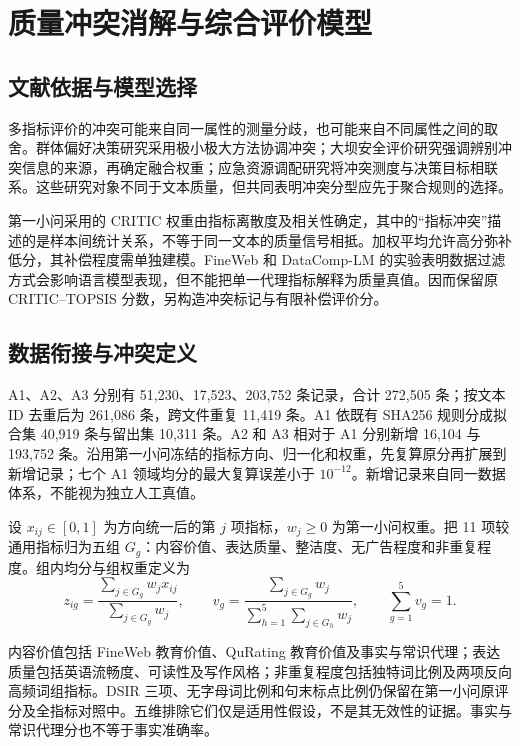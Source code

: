 \documentclass[UTF8,a4paper,12pt]{ctexart}
\begin{document}
\setcounter{section}{2}
\section{质量冲突消解与综合评价模型}
\label{sec:q12}

\subsection{文献依据与模型选择}

多指标评价的冲突可能来自同一属性的测量分歧，也可能来自不同属性之间的取舍。群体偏好决策研究采用极小极大方法协调冲突\cite{yu2016}；大坝安全评价研究强调辨别冲突信息的来源，再确定融合权重\cite{wang2023}；应急资源调配研究将冲突测度与决策目标相联系\cite{chen2026}。这些研究对象不同于文本质量，但共同表明冲突分型应先于聚合规则的选择。

第一小问采用的 CRITIC 权重由指标离散度及相关性确定\cite{diakoulaki1995}，其中的“指标冲突”描述的是样本间统计关系，不等于同一文本的质量信号相抵。加权平均允许高分弥补低分，其补偿程度需单独建模\cite{giarlotta2001}。FineWeb 和 DataComp-LM 的实验表明数据过滤方式会影响语言模型表现\cite{penedo2024,li2024}，但不能把单一代理指标解释为质量真值。因而保留原 CRITIC--TOPSIS 分数，另构造冲突标记与有限补偿评价分。

\subsection{数据衔接与冲突定义}

A1、A2、A3 分别有 51,230、17,523、203,752 条记录，合计 272,505 条；按文本 ID 去重后为 261,086 条，跨文件重复 11,419 条。A1 依既有 SHA256 规则分成拟合集 40,919 条与留出集 10,311 条。A2 和 A3 相对于 A1 分别新增 16,104 与 193,752 条。沿用第一小问冻结的指标方向、归一化和权重，先复算原分再扩展到新增记录；七个 A1 领域均分的最大复算误差小于 $10^{-12}$。新增记录来自同一数据体系，不能视为独立人工真值。

设 $x_{ij}\in[0,1]$ 为方向统一后的第 $j$ 项指标，$w_j\geq0$ 为第一小问权重。把 11 项较通用指标归为五组 $G_g$：内容价值、表达质量、整洁度、无广告程度和非重复程度。组内均分与组权重定义为
\begin{equation}
z_{ig}=\frac{\sum_{j\in G_g}w_jx_{ij}}{\sum_{j\in G_g}w_j},\qquad
v_g=\frac{\sum_{j\in G_g}w_j}{\sum_{h=1}^{5}\sum_{j\in G_h}w_j},
\qquad \sum_{g=1}^{5}v_g=1.
\label{eq:q12-group}
\end{equation}

内容价值包括 FineWeb 教育价值、QuRating 教育价值及事实与常识代理；表达质量包括英语流畅度、可读性及写作风格；非重复程度包括独特词比例及两项反向高频词组指标。DSIR 三项、无字母词比例和句末标点比例仍保留在第一小问原评分及全指标对照中。五维排除它们仅是适用性假设，不是其无效性的证据。事实与常识代理分也不等于事实准确率。
\end{document}
